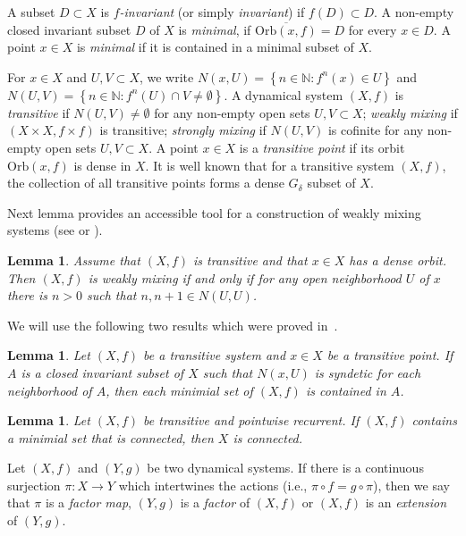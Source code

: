 \documentclass[reqno,a4paper,12pt]{amsart}
\newtheorem{lem}[thm]{Lemma}
\theoremstyle{definition}
\numberwithin{equation}{section}
\begin{document}
A subset $D \subset X$ is \emph{$f$-invariant} (or simply \emph{invariant}) if $f(D)\subset D$.
A non-empty closed invariant subset $D$ of $X$ is \emph{minimal}, if $\overline{{\mbox{Orb}}(x,f)} = D$ for every $x \in D$.
A point $x \in  X$ is \emph{minimal} if it is contained in a minimal subset of $X$.

For $x\in X$ and $U,V\subset X$, we write $N(x,U)={\left\{{n\in{\mathbb{N}}: f^n(x)\in U}\right\}}$ and
$N(U,V)={\left\{{n\in {\mathbb{N}}: f^n(U)\cap V\neq\emptyset}\right\}}$.
A dynamical system $(X,f)$ is \emph{transitive} if $N(U,V)\neq\emptyset$
for any non-empty open sets $U,V\subset X$; \emph{weakly mixing} if $(X\times X, f\times f)$ is transitive;
\emph{strongly mixing} if $N(U,V)$ is cofinite  for any non-empty open sets $U,V\subset X$.
A point $x\in X$ is a \emph{transitive point} if its orbit ${\mbox{Orb}}(x,f)$ is dense in $X$.
It is well known that for a transitive system $(X,f)$, the collection of all transitive points forms
a dense $G_\delta$ subset of $X$.

Next lemma provides an accessible tool for a construction of weakly mixing systems
(see \cite[Lemma~5.1]{HY05} or \cite[Lemma~3.8]{OprWM}).

\begin{lem}\label{lem:WM}
Assume that $(X,f)$ is transitive and that $x\in X$ has a dense orbit. Then $(X,f)$ is weakly mixing if and only if
for any open neighborhood $U$ of $x$ there is $n>0$ such that $n,n+1\in N(U,U)$.
\end{lem}

We will use the following two results which were proved in~\cite[Lemma 2.2 and Theorem 4.3]{HYBeb}.

\begin{lem}\label{lem:proximal}
Let $(X,f)$ be a transitive system and $x\in X$ be a transitive point.
If $A$ is a closed invariant subset of $ X$ such that $N(x,U)$ is syndetic for each neighborhood of $A$, then each minimial set of $(X,f)$ is contained in $A$.
\end{lem}

\begin{lem}\label{lem:connected}
Let $(X,f)$ be transitive and pointwise recurrent.
If $(X,f)$ contains a minimial set that is connected, then $X$ is connected.
\end{lem}

Let $(X,f)$ and $(Y,g)$ be two dynamical systems.
If there is a continuous surjection $\pi\colon X\to Y$ which intertwines the actions (i.e., $\pi\circ f=g\circ \pi$),
then we say that $\pi$ is a \emph{factor map},
$(Y,g)$ is a \emph{factor} of $(X,f)$ or $(X,f)$ is an \emph{extension} of $(Y,g)$.
\end{document}
